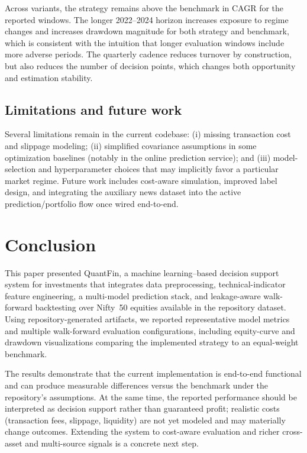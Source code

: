\documentclass[conference]{IEEEtran}
\begin{document}
Across variants, the strategy remains above the benchmark in CAGR for the reported windows. The longer 2022--2024 horizon increases exposure to regime changes and increases drawdown magnitude for both strategy and benchmark, which is consistent with the intuition that longer evaluation windows include more adverse periods. The quarterly cadence reduces turnover by construction, but also reduces the number of decision points, which changes both opportunity and estimation stability.

\subsection{Limitations and future work}
Several limitations remain in the current codebase: (i) missing transaction cost and slippage modeling; (ii) simplified covariance assumptions in some optimization baselines (notably in the online prediction service); and (iii) model-selection and hyperparameter choices that may implicitly favor a particular market regime. Future work includes cost-aware simulation, improved label design, and integrating the auxiliary news dataset into the active prediction/portfolio flow once wired end-to-end.

\section{Conclusion}
This paper presented QuantFin, a machine learning--based decision support system for investments that integrates data preprocessing, technical-indicator feature engineering, a multi-model prediction stack, and leakage-aware walk-forward backtesting over Nifty~50 equities available in the repository dataset. Using repository-generated artifacts, we reported representative model metrics and multiple walk-forward evaluation configurations, including equity-curve and drawdown visualizations comparing the implemented strategy to an equal-weight benchmark.

The results demonstrate that the current implementation is end-to-end functional and can produce measurable differences versus the benchmark under the repository's assumptions. At the same time, the reported performance should be interpreted as decision support rather than guaranteed profit; realistic costs (transaction fees, slippage, liquidity) are not yet modeled and may materially change outcomes. Extending the system to cost-aware evaluation and richer cross-asset and multi-source signals is a concrete next step.

\FloatBarrier



\end{document}
